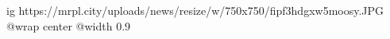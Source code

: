  
 
 
 
 

\ifcmt
  ig https://mrpl.city/uploads/news/resize/w/750x750/fipf3hdgxw5moosy.JPG
  @wrap center
  @width 0.9
\fi
